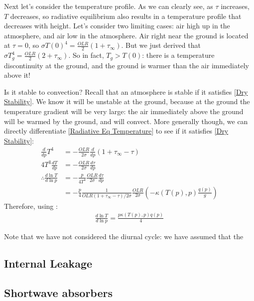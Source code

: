 Next let's consider the temperature profile. As we can clearly see, as $\tau$ increases, $T$ decreases, so radiative equilibrium also results in a temperature profile that decreases with height. Let's consider two limiting cases: air high up in the atmosphere, and air low in the atmosphere. Air right near the ground is located at $\tau=0$, so $\sigma T(0)^4=\frac{OLR}{2}(1+\tau_\infty)$. But we just derived that $\sigma T_g^4=\frac{OLR}{2}(2+\tau_\infty)$. So in fact, $T_g>T(0)$: there is a temperature discontinuity at the ground, and the ground is warmer than the air immediately above it! 

Is it stable to convection? Recall that an atmosphere is stable if it satisfies \ref{Dry Stability}. We know it will be unstable at the ground, because at the ground the temperature gradient will be very large: the air immediately above the ground will be warmed by the ground, and will convect. More generally though, we can directly differentiate \ref{Radiative Eq Temperature} to see if it satisfies \ref{Dry Stability}:
\begin{align*}
    \frac{d}{dp}T^4&=-\frac{OLR}{2\sigma}\frac{d}{dp}(1+\tau_\infty-\tau)\\
    4T^3\frac{dT}{dp}&=-\frac{OLR}{2\sigma}\frac{d\tau}{dp}\\
    \therefore
    \frac{d\ln T}{d\ln p}&=-\frac{p}{4T^4}\frac{OLR}{2\sigma}\frac{d\tau}{dp}\\
    &=-\frac{p}{4}\frac{1}{OLR(1+\tau_\infty-\tau)/2\sigma}\frac{OLR}{2\sigma}
    \left( -\kappa(T(p),p) \frac{q(p)}{g} \right)
\end{align*}
Therefore, using :
\begin{align}
    \frac{d\ln T}{d\ln p} = \frac{p\kappa(T(p),p)q(p)}{4}
\end{align}

Note that we have not considered the diurnal cycle: we have assumed that the 


\subsection{Internal Leakage}

\subsection{Shortwave absorbers}\label{Shortwave}
